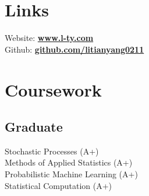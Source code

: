 \documentclass[letterpaper]{deedy-resume} %
\begin{document}

\lastupdated %



\begin{minipage}[t]{0.33\textwidth} %


\section{Links} 
Website: \href{www.l-ty.com}{\bf www.l-ty.com} \\
Github: \href{https://github.com/litianyang0211}{\bf github.com/litianyang0211} \\

\sectionspace %


\section{Coursework}
\subsection{Graduate}
Stochastic Processes (A+)\\%
Methods of Applied Statistics (A+) \\
Probabilistic Machine Learning (A+)\\%
Statistical Computation (A+) \\


\end{minipage}
\end{document}
